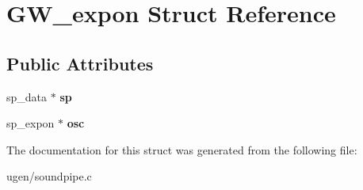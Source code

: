 \hypertarget{structGW__expon}{}\section{G\+W\+\_\+expon Struct Reference}
\label{structGW__expon}
\subsection*{Public Attributes}
\begin{DoxyCompactItemize}
\item 
\hypertarget{structGW__expon_a595f9168c8d6d02e424916f2da6932a9}{}\label{structGW__expon_a595f9168c8d6d02e424916f2da6932a9} 
sp\+\_\+data $\ast$ {\bfseries sp}
\item 
\hypertarget{structGW__expon_a076463fd8b55615bf6335e0277038f89}{}\label{structGW__expon_a076463fd8b55615bf6335e0277038f89} 
sp\+\_\+expon $\ast$ {\bfseries osc}
\end{DoxyCompactItemize}


The documentation for this struct was generated from the following file\+:\begin{DoxyCompactItemize}
\item 
ugen/soundpipe.\+c\end{DoxyCompactItemize}

